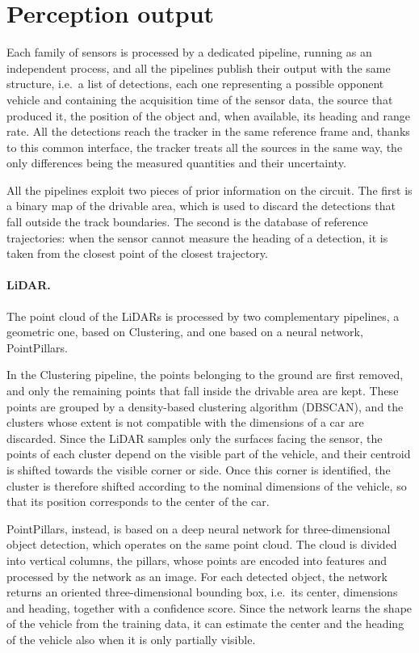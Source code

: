 \section{Perception output}
\label{sec:tt_perception}

Each family of sensors is processed by a dedicated pipeline, running as an independent
process, and all the pipelines publish their output with the same structure, i.e.\ a list of
detections, each one representing a possible opponent vehicle and containing the acquisition
time of the sensor data, the source that produced it, the position of the object and, when
available, its heading and range rate. All the detections reach the tracker in the same
reference frame and, thanks to this common interface, the tracker treats all the sources in
the same way, the only differences being the measured quantities and their uncertainty.

All the pipelines exploit two pieces of prior information on the circuit. The first is a
binary map of the drivable area, which is used to discard the detections that fall outside the track boundaries. The second is the database of reference trajectories: when the sensor cannot measure the heading of a detection, it is taken from the closest
point of the closest trajectory.

\paragraph{LiDAR.} The point cloud of the LiDARs is processed by two complementary pipelines,
a geometric one, based on Clustering, and one based on a neural network, PointPillars.

In the Clustering pipeline, the points belonging to the ground are first removed, and only the
remaining points that fall inside the drivable area are kept. These points are grouped by a
density-based clustering algorithm (DBSCAN), and the clusters whose extent is not compatible
with the dimensions of a car are discarded. Since the LiDAR samples only the surfaces facing
the sensor, the points of each cluster depend on the visible part of the vehicle, and their
centroid is shifted towards the visible corner or side. Once this corner is identified, the
cluster is therefore shifted according to the nominal dimensions of the vehicle, so that its
position corresponds to the center of the car.

PointPillars, instead, is based on a deep neural network for three-dimensional object
detection, which operates on the same point cloud. The cloud is divided into vertical columns,
the pillars, whose points are encoded into features and processed by the network as an image.
For each detected object, the network returns an oriented three-dimensional bounding box,
i.e.\ its center, dimensions and heading, together with a confidence score. Since the network
learns the shape of the vehicle from the training data, it can estimate the center and the
heading of the vehicle also when it is only partially visible.

